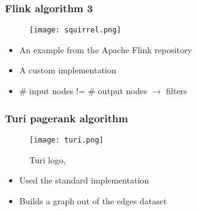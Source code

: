 \begin{frame}
\frametitle{Flink algorithm 3}
\begin{figure}

	\texttt{[image: squirrel.png]}

\end{figure}

\begin{itemize}
\item An example from the Apache Flink repository
\item A custom implementation
\item \# input nodes != \# output nodes $\rightarrow$ filters
\end{itemize}
\end{frame}


\begin{frame}
\frametitle{Turi pagerank algorithm}
\begin{figure}
	\centering
	\texttt{[image: turi.png]}
	\caption{Turi logo, \cite{turi}}
\end{figure}
\begin{itemize}
\item Used the standard implementation
\item Builds a graph out of the edges dataset
\end{itemize}


\end{frame}
